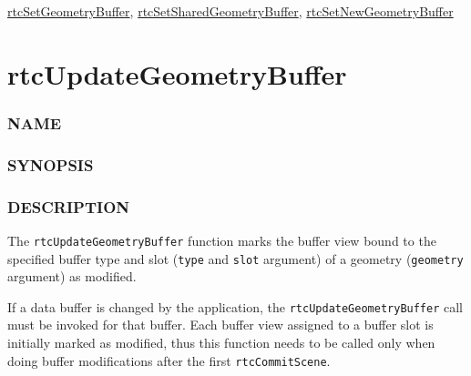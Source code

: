 \hyperref[rtcsetgeometrybuffer]{rtcSetGeometryBuffer},
\hyperref[rtcsetsharedgeometrybuffer]{rtcSetSharedGeometryBuffer},
\hyperref[rtcsetnewgeometrybuffer]{rtcSetNewGeometryBuffer}

\pagebreak

\section{rtcUpdateGeometryBuffer}\label{rtcupdategeometrybuffer}

\subsubsection{NAME}\label{name}

\begin{Shaded}
\begin{Highlighting}[]
\OperatorTok{{-}}
\end{Highlighting}
\end{Shaded}

\subsubsection{SYNOPSIS}\label{synopsis}

\begin{Shaded}
\begin{Highlighting}[]

\OperatorTok{(}
\OperatorTok{,}
  \OperatorTok{,}
   
\OperatorTok{);}
\end{Highlighting}
\end{Shaded}

\subsubsection{DESCRIPTION}\label{description}

The \texttt{rtcUpdateGeometryBuffer} function marks the buffer view
bound to the specified buffer type and slot (\texttt{type} and
\texttt{slot} argument) of a geometry (\texttt{geometry} argument) as
modified.

If a data buffer is changed by the application, the
\texttt{rtcUpdateGeometryBuffer} call must be invoked for that buffer.
Each buffer view assigned to a buffer slot is initially marked as
modified, thus this function needs to be called only when doing buffer
modifications after the first \texttt{rtcCommitScene}.


